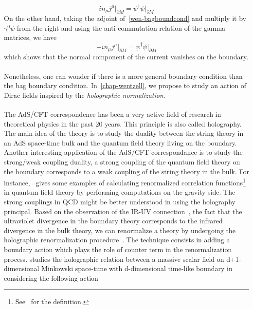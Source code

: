 \begin{equation*}
i n_\mu j^\mu \big\vert_{\partial M}= \psi^\dagger\psi \big\vert_{\partial M}
\end{equation*}
On the other hand, taking the adjoint of~\cref{wen-bagboundcond} and multiply it by $\gamma^0\psi$ from the right and using the anti-commutation relation of the gamma matrices, we have
\begin{equation*}
- i n_\mu j^\mu \big\vert_{\partial M} = \psi^\dagger\psi\big\vert_{\partial M}
\end{equation*}
which shows that the normal component of the current vanishes on the boundary. \\\\
Nonetheless, one can wonder if there is a more general boundary condition than the bag boundary condition. 
In~\cref{chap-wentzell}, we propose to study an action of Dirac fields inspired by the \textit{holographic normalization}. \\\\
%
The AdS/CFT correspondence has been a very active field of research in theoretical physics in the past 20 years. 
This principle is also called holography.
The main idea of the theory is to study the duality between the string theory in an AdS space-time bulk and the quantum field theory living on the boundary.
Another interesting application of the AdS/CFT correspondance is to study the strong/weak coupling duality, \ie
a strong coupling of the quantum field theory on the boundary corresponds to a weak coupling of the string theory in the bulk. 
For instance,~\cite{Skenderis2002} gives some examples of calculating renormalized correlation functions\footnote{
See~\eg\cite{Peskin1995} for the definition.
} in quantum field theory by performing computations on the gravity side.
The strong couplings in QCD might be better understood in using the holography principal. 
Based on the observation of the IR-UV connection~\cite{Susskind1998}, 
\ie the fact that the ultraviolet divergence in the boundary theory corresponds to the infrared divergence in the bulk theory, 
we can renormalize a theory by undergoing the holographic renormalization procedure~\cite{Skenderis2002}. 
The technique consists in adding a boundary action which plays the role of counter term in the renormalization process.
\cite{Zahn2016} studies the holographic relation between a massive scalar field on d+1-dimensional Minkowski space-time with d-dimensional time-like boundary in considering the following action
